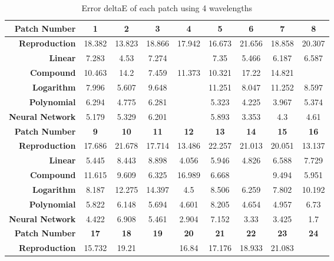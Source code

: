 \begin{table}[H]
  \caption{\label{tab:Euclidean distance of each patch for 4 images}Error deltaE of each patch using 4 wavelengths}
  \begin{center}
    \begin{tabularx}{\textwidth}{r c c c c c c c c}
    \toprule
        \textbf{Patch Number} & \textbf{1} & \textbf{2} & \textbf{3} & \textbf{4} & \textbf{5} & \textbf{6} & \textbf{7} & \textbf{8}\\ \midrule 
        \textbf{Reproduction} &18.382 &13.823 &18.866 &17.942 &16.673 &21.656 &18.858 &20.307\\ 
        \textbf{Linear} &7.283 &4.53 &7.274 &\cellcolor{colorred}{12.56} &7.35 &5.466 &6.187 &6.587\\ 
        \textbf{Compound} &10.463 &14.2 &7.459 &11.373 &10.321 &17.22 &14.821 &\cellcolor{colorred}{21.988}\\ 
        \textbf{Logarithm} &7.996 &5.607 &9.648 &\cellcolor{colorred}{15.072} &11.251 &8.047 &11.252 &8.597\\ 
        \textbf{Polynomial} &6.294 &4.775 &6.281 &\cellcolor{colorred}{8.522} &5.323 &4.225 &3.967 &5.374\\ 
        \textbf{Neural Network} &5.179 &5.329 &6.201 &\cellcolor{colorred}{7.442} &5.893 &3.353 &4.3 &4.61\\ \midrule 
        \textbf{Patch Number} & \textbf{9} & \textbf{10} & \textbf{11} & \textbf{12} & \textbf{13} & \textbf{14} & \textbf{15} & \textbf{16}\\ \midrule 
        \textbf{Reproduction} &17.686 &21.678 &17.714 &13.486 &22.257 &21.013 &20.051 &13.137\\ 
        \textbf{Linear} &5.445 &8.443 &8.898 &4.056 &5.946 &4.826 &6.588 &7.729\\ 
        \textbf{Compound} &11.615 &9.609 &6.325 &16.989 &6.668 &\cellcolor{colorgreen}{5.001} &9.494 &5.951\\ 
        \textbf{Logarithm} &8.187 &12.275 &14.397 &4.5 &8.506 &6.259 &7.802 &10.192\\ 
        \textbf{Polynomial} &5.822 &6.148 &5.694 &4.601 &8.205 &4.654 &4.957 &6.73\\ 
        \textbf{Neural Network} &4.422 &6.908 &5.461 &2.904 &7.152 &3.33 &3.425 &1.7\\ \midrule 
        \textbf{Patch Number} & \textbf{17} & \textbf{18} & \textbf{19} & \textbf{20} & \textbf{21} & \textbf{22} & \textbf{23} & \textbf{24}\\ \midrule 
        \textbf{Reproduction} &15.732 &19.21 &\cellcolor{colorgreen}{8.956} &16.84 &17.176 &18.933 &21.083 &\cellcolor{colorred}{26.841}\\ 

\end{tabularx}
\end{center}
\end{table}

